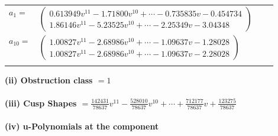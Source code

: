 \documentclass[1p]{elsarticle_modified}
\theoremstyle{definition}
\begin{document}
\begin{tabular}{m{7pt} m{180pt} m{7pt} m{180pt} }
\flushright $a_{1}=$&$\begin{pmatrix}0.613949 v^{11}-1.71800 v^{10}+\cdots-0.735835 v-0.454734\\1.86146 v^{11}-5.23525 v^{10}+\cdots-2.25349 v-3.04348\end{pmatrix}$ \\
\flushright $a_{10}=$&$\begin{pmatrix}1.00827 v^{11}-2.68986 v^{10}+\cdots-1.09637 v-1.28028\\1.00827 v^{11}-2.68986 v^{10}+\cdots-1.09637 v-2.28028\end{pmatrix}$\\&\end{tabular}
\flushleft \textbf{(ii) Obstruction class $= 1$}\\~\\
\flushleft \textbf{(iii) Cusp Shapes $= \frac{142431}{78637} v^{11}-\frac{528010}{78637} v^{10}+\cdots+\frac{712177}{78637} v+\frac{123275}{78637}$}\\~\\
\newpage\renewcommand{\arraystretch}{1}
\flushleft \textbf{(iv) u-Polynomials at the component}\newline \\
\end{document}
